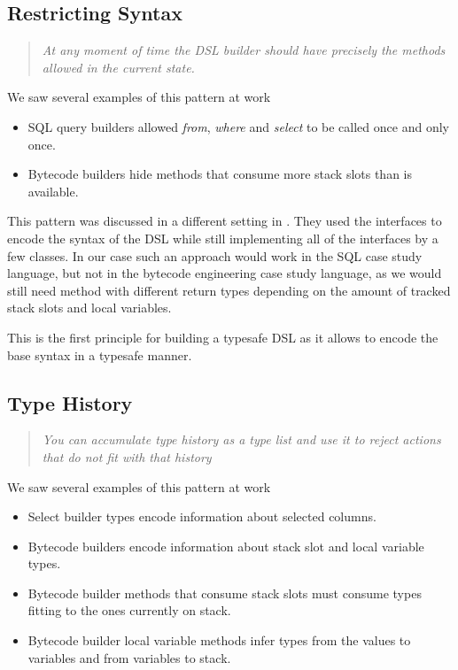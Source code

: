 \documentclass{sig-alternate}
\begin{document}
\subsection{Restricting Syntax}

\begin{quote}
\emph{At any moment of time the DSL builder should have precisely the methods allowed in the current state.}
\end{quote}

We saw several examples of this pattern at work
\begin{itemize}
\item SQL query builders allowed \emph{from}, \emph{where} and \emph{select} to be called once and only once.
\item Bytecode builders hide methods that consume more stack slots than is available.
\end{itemize}

This pattern was discussed in a different setting in \cite{freeman2004jsr}. They used the interfaces to encode the syntax of the DSL while still implementing all of the interfaces by a few classes. In our case such an approach would work in the SQL case study language, but not in the bytecode engineering case study language, as we would still need method with different return types depending on the amount of tracked stack slots and local variables. 

This is the first principle for building a typesafe DSL as it allows to encode the base syntax in a typesafe manner.

\subsection{Type History}

\begin{quote}
\emph{You can accumulate type history as a type list and use it to reject actions that do not fit with that history}
\end{quote}

We saw several examples of this pattern at work
\begin{itemize}
\item Select builder types encode information about selected columns. 
\item Bytecode builders encode information about stack slot and local variable types.
\item Bytecode builder methods that consume stack slots must consume types fitting to the ones currently on stack.
\item Bytecode builder local variable methods infer types from the values to variables and from variables to stack.
\end{itemize}
\end{document}
